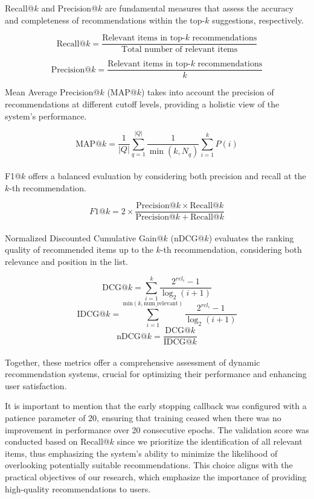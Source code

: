\documentclass[bst/sn-nature]{sn-jnl}
\begin{document}
\begin{multicols}{2}
Recall@$k$ and Precision@$k$ are fundamental measures that assess the accuracy and completeness of recommendations within the top-$k$ suggestions, respectively. 

\[
\text{Recall@}k = \frac{\text{Relevant items in top-} k\text{ recommendations}}{\text{Total number of relevant items}}
\]

\[
\text{Precision@}k = \frac{\text{Relevant items in top-} k\text{ recommendations}}{k}
\]

Mean Average Precision@$k$ (MAP@$k$) takes into account the precision of recommendations at different cutoff levels, providing a holistic view of the system's performance. 

\[
\text{MAP@}k = \frac{1}{|Q|} \sum_{q=1}^{|Q|} \frac{1}{\min(k, N_q)} \sum_{i=1}^k P(i)
\] \\ 

F1@$k$ offers a balanced evaluation by considering both precision and recall at the $k$-th recommendation. 

\[ F1@k = 2 \times \frac{\text{Precision@$k$} \times \text{Recall@$k$}}{\text{Precision@$k$} + \text{Recall@$k$}} \] \\ 

Normalized Discounted Cumulative Gain@$k$ (nDCG@$k$) evaluates the ranking quality of recommended items up to the $k$-th recommendation, considering both relevance and position in the list. 

\[ \text{DCG@$k$} = \sum_{i=1}^{k} \frac{2^{rel_i} - 1}{\log_2(i+1)} \]
\[ \text{IDCG@$k$} = \sum_{i=1}^{\text{min}(k, \text{num\_relevant})} \frac{2^{rel_i} - 1}{\log_2(i+1)} \]
\[ \text{nDCG@$k$} = \frac{\text{DCG@$k$}}{\text{IDCG@$k$}} \] \\ 

Together, these metrics offer a comprehensive assessment of dynamic recommendation systems, crucial for optimizing their performance and enhancing user satisfaction.

It is important to mention that the early stopping callback was configured with a patience parameter of 20, ensuring that training ceased when there was no improvement in performance over 20 consecutive epochs. The validation score was conducted based on Recall@$k$ since we prioritize the identification of all relevant items, thus emphasizing the system's ability to minimize the likelihood of overlooking potentially suitable recommendations. This choice aligns with the practical objectives of our research, which emphasize the importance of providing high-quality recommendations to users.


\end{multicols}
\end{document}
